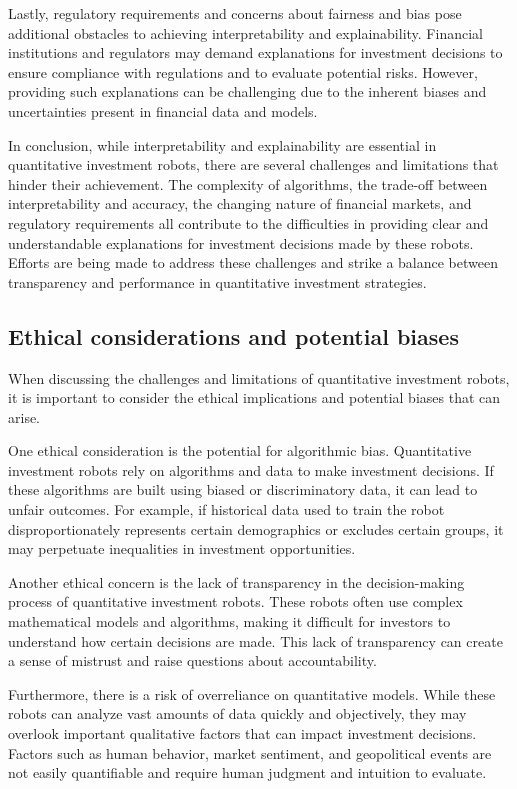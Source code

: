 \documentclass[UTF8]{ctexart}
\begin{document}
Lastly, regulatory requirements and concerns about fairness and bias pose additional obstacles to achieving interpretability and explainability. Financial institutions and regulators may demand explanations for investment decisions to ensure compliance with regulations and to evaluate potential risks. However, providing such explanations can be challenging due to the inherent biases and uncertainties present in financial data and models.

In conclusion, while interpretability and explainability are essential in quantitative investment robots, there are several challenges and limitations that hinder their achievement. The complexity of algorithms, the trade-off between interpretability and accuracy, the changing nature of financial markets, and regulatory requirements all contribute to the difficulties in providing clear and understandable explanations for investment decisions made by these robots. Efforts are being made to address these challenges and strike a balance between transparency and performance in quantitative investment strategies.

\subsection{Ethical considerations and potential biases}
When discussing the challenges and limitations of quantitative investment robots, it is important to consider the ethical implications and potential biases that can arise.

One ethical consideration is the potential for algorithmic bias. Quantitative investment robots rely on algorithms and data to make investment decisions. If these algorithms are built using biased or discriminatory data, it can lead to unfair outcomes. For example, if historical data used to train the robot disproportionately represents certain demographics or excludes certain groups, it may perpetuate inequalities in investment opportunities.

Another ethical concern is the lack of transparency in the decision-making process of quantitative investment robots. These robots often use complex mathematical models and algorithms, making it difficult for investors to understand how certain decisions are made. This lack of transparency can create a sense of mistrust and raise questions about accountability.

Furthermore, there is a risk of overreliance on quantitative models. While these robots can analyze vast amounts of data quickly and objectively, they may overlook important qualitative factors that can impact investment decisions. Factors such as human behavior, market sentiment, and geopolitical events are not easily quantifiable and require human judgment and intuition to evaluate.
\end{document}
